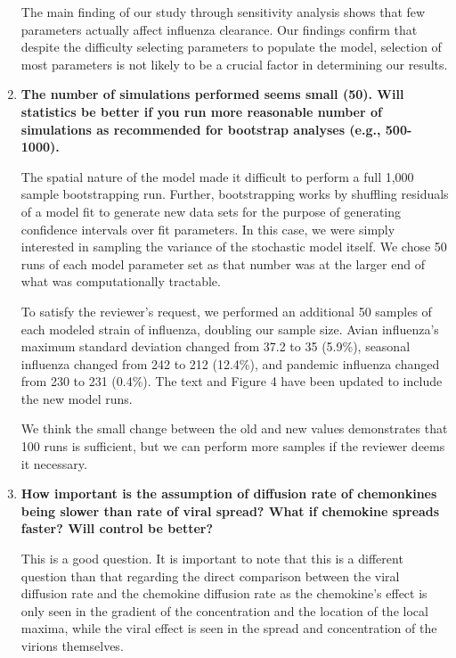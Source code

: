 \documentclass[10pt]{article}
\newenvironment{response}{\fontfamily{cms}\selectfont\small}{\par}
\begin{document}
\begin{enumerate}
\begin{response}
The main finding of our study through sensitivity analysis shows that few parameters actually affect influenza clearance. Our findings confirm that despite the difficulty selecting parameters to populate the model, selection of most parameters is not likely to be a crucial factor in determining our results.​

\end{response}


\item \textbf{The number of simulations performed seems small (50). Will statistics be better if you run more reasonable number of simulations as recommended for bootstrap analyses (e.g., 500-1000).}

\begin{response}
The spatial nature of the model made it difficult to perform a full 1,000 sample bootstrapping run. Further, bootstrapping works by shuffling residuals of a model fit to generate new data sets for the purpose of generating confidence intervals over fit parameters.  In this case, we were simply interested in sampling the variance of the stochastic model itself.  We chose 50 runs of each model parameter set as that number was at the larger end of what was computationally tractable.

To satisfy the reviewer's request, we performed an additional 50 samples of each modeled strain of influenza, doubling our sample size.  Avian influenza's maximum standard deviation changed from 37.2 to 35 (5.9\%), seasonal influenza changed from 242 to 212 (12.4\%), and pandemic influenza changed from 230 to 231 (0.4\%).  The text and Figure 4 have been updated to include the new model runs.

We think the small change between the old and new values demonstrates that 100 runs is sufficient, but we can perform more samples if the reviewer deems it necessary.
\end{response}

\item \textbf{How important is the assumption of diffusion rate of chemonkines being slower than rate of viral spread? What if chemokine spreads faster? Will control be better?}

\begin{response}
This is a good question.  It is important to note that this is a different question than that regarding the direct comparison between the viral diffusion rate and the chemokine diffusion rate as the chemokine's effect is only seen in the gradient of the concentration and the location of the local maxima, while the viral effect is seen in the spread and concentration of the virions themselves.  


\end{response}
\end{enumerate}
\end{document}
